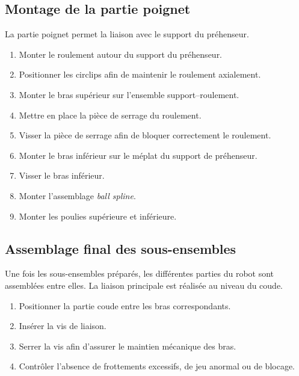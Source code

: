 \subsection{Montage de la partie poignet}

La partie poignet permet la liaison avec le support du préhenseur. 

\begin{enumerate}
    \item Monter le roulement autour du support du préhenseur.
    \item Positionner les circlips afin de maintenir le roulement axialement.
    \item Monter le bras supérieur sur l'ensemble support--roulement.
    \item Mettre en place la pièce de serrage du roulement.
    \item Visser la pièce de serrage afin de bloquer correctement le roulement.
    \item Monter le bras inférieur sur le méplat du support de préhenseur.
    \item Visser le bras inférieur.
    \item Monter l'assemblage \textit{ball spline}.
    \item Monter les poulies supérieure et inférieure.
\end{enumerate}

\subsection{Assemblage final des sous-ensembles}
Une fois les sous-ensembles préparés, les différentes parties du robot sont assemblées entre elles. La liaison principale est réalisée au niveau du coude.
\begin{enumerate}
    \item Positionner la partie coude entre les bras correspondants.
    \item Insérer la vis de liaison.
    \item Serrer la vis afin d'assurer le maintien mécanique des bras.
    \item Contrôler l'absence de frottements excessifs, de jeu anormal ou de blocage.
\end{enumerate}